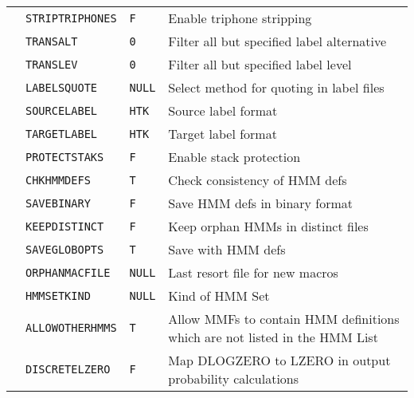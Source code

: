 \begin{center}
\begin{supertabular}{|p{1.4cm}|l|l|p{6.6cm}|}
  & \texttt{STRIPTRIPHONES} & \texttt{F} & Enable triphone stripping \\ 
  & \texttt{TRANSALT} & \texttt{0} & Filter all but specified label alternative \\ 
  & \texttt{TRANSLEV} & \texttt{0} & Filter all but specified label level \\ 
  & \texttt{LABELSQUOTE} & \texttt{NULL} & Select method for quoting in label files \\ 
  & \texttt{SOURCELABEL} & \texttt{HTK} & Source label format \\ 
  & \texttt{TARGETLABEL} & \texttt{HTK} & Target label format \\ \hline



 & \texttt{PROTECTSTAKS} & \texttt{F} & Enable stack protection \\ \hline


  & \texttt{CHKHMMDEFS} & \texttt{T} & Check consistency of HMM defs \\ 
  & \texttt{SAVEBINARY} & \texttt{F} & Save HMM defs in binary format \\ 
  & \texttt{KEEPDISTINCT} & \texttt{F} & Keep orphan HMMs in distinct files \\ 
  & \texttt{SAVEGLOBOPTS} & \texttt{T} & Save  with HMM defs \\ 
  & \texttt{ORPHANMACFILE} & \texttt{NULL} & Last resort file for new macros \\ 
  & \texttt{HMMSETKIND} & \texttt{NULL} & Kind of HMM Set \\ 
  & \texttt{ALLOWOTHERHMMS} & \texttt{T} & Allow MMFs to contain HMM definitions which are 
  not listed in the HMM List \\ 
  & \texttt{DISCRETELZERO}  & \texttt{F} & Map DLOGZERO to LZERO in output probability 
  calculations \\ \hline


\end{supertabular}
\end{center}
